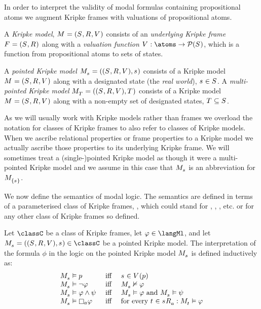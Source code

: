 In order to interpret the validity of modal formulas containing propositional atoms we augment Kripke frames with valuations of propositional atoms.

\begin{definition}
A {\em Kripke model}, $\kModelAndTuple$ consists of an {\em underlying Kripke frame} $\kFrameAndTuple$ along with a {\em valuation function} $\kValuation : \atoms \to \powerset(\kStates)$, which is a function from propositional atoms to sets of states.

A {\em pointed Kripke model} $\kPModelAndTuple{\kStateS}$ consists of a Kripke model $\kModelAndTuple$ along with a designated state (the {\em real world}), $\kStateS \in \kStates$.
A {\em multi-pointed Kripke model} $\kPModelAndTuple{\kStatesT}$ consists of a Kripke model $\kModelAndTuple$ along with a non-empty set of designated states, $\kStatesT \subseteq \kStates$.
\end{definition}

As we will usually work with Kripke models rather than frames we overload the notation for classes of Kripke frames to also refer to classes of Kripke models.
When we ascribe relational properties or frame properties to a Kripke model we actually ascribe those properties to its underlying Kripke frame.
We will sometimes treat a (single-)pointed Kripke model as though it were a multi-pointed Kripke model and we assume in this case that $\kPModel{\kStateS}$ is an abbreviation for $\kPModel{\{\kStateS\}}$.

We now define the semantics of modal logic.
The semantics are defined in terms of a parameterised class of Kripke frames, \classC{}, which could stand for \classK{}, \classKF{}, \classKFF{}, etc. or for any other class of Kripke frames so defined.

\begin{definition}\label{ml-semantics}
Let $\classC$ be a class of Kripke frames, let $\phi \in \langMl$, and let $\kPModelAndTuple{\kStateS} \in \classC$ be a pointed Kripke model.
The interpretation of the formula $\phi$ in the logic \logicC{} on the pointed Kripke model $\kPModel{\kStateS}$ is defined inductively as:
$$
\begin{array}{lcl}
\kPModel{\kStateS} \entails \atomP & \text{ iff } & \kStateS \in \kValuation(\atomP)\\
\kPModel{\kStateS} \entails \lnot \phi & \text{ iff } & \kPModel{\kStateS} \nentails \phi\\
\kPModel{\kStateS} \entails \phi \land \psi & \text{ iff } & \kPModel{\kStateS} \entails \phi \text{ and } \kPModel{\kStateS} \entails \psi\\
\kPModel{\kStateS} \entails \necessaryA \phi & \text{ iff } & \text{for every } \kStateT \in \kSuccessorsA{\kStateS} : \kPModel{\kStateT} \entails \phi
\end{array}
$$
\end{definition}

